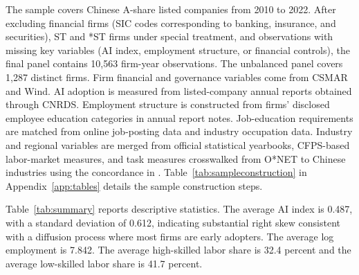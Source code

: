 \documentclass[12pt,a4paper]{article}
\theoremstyle{predstyle}
\theoremstyle{plain}
\begin{document}
The sample covers Chinese A-share listed companies from 2010 to 2022. After excluding financial firms (SIC codes corresponding to banking, insurance, and securities), ST and *ST firms under special treatment, and observations with missing key variables (AI index, employment structure, or financial controls), the final panel contains 10,563 firm-year observations. The unbalanced panel covers 1,287 distinct firms. Firm financial and governance variables come from CSMAR and Wind. AI adoption is measured from listed-company annual reports obtained through CNRDS. Employment structure is constructed from firms' disclosed employee education categories in annual report notes. Job-education requirements are matched from online job-posting data and industry occupation data. Industry and regional variables are merged from official statistical yearbooks, CFPS-based labor-market measures, and task measures crosswalked from O*NET to Chinese industries using the concordance in \citet{autor2013china}. Table~\ref{tab:sampleconstruction} in Appendix~\ref{app:tables} details the sample construction steps.

Table~\ref{tab:summary} reports descriptive statistics. The average AI index is 0.487, with a standard deviation of 0.612, indicating substantial right skew consistent with a diffusion process where most firms are early adopters. The average log employment is 7.842. The average high-skilled labor share is 32.4 percent and the average low-skilled labor share is 41.7 percent.
\end{document}
